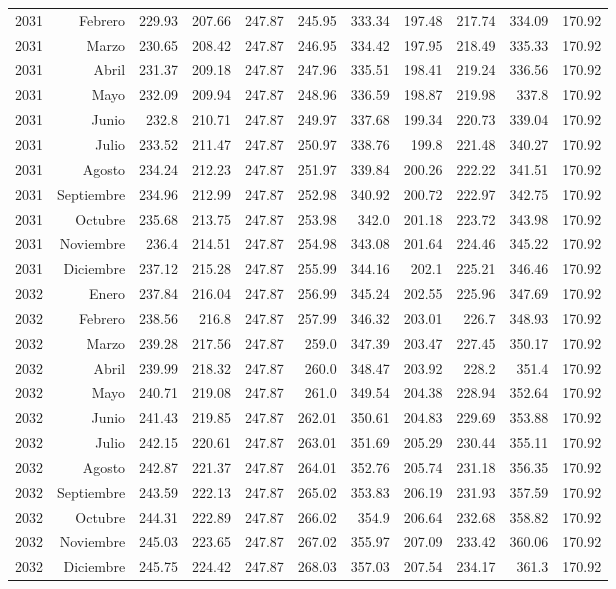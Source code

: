 \documentclass{article}%
\begin{document}
\begin{longtable}{|l r|r|r|r|r|r|r|r|r|r|}
2031&Febrero&229.93&207.66&247.87&245.95&333.34&197.48&217.74&334.09&170.92\\%
2031&Marzo&230.65&208.42&247.87&246.95&334.42&197.95&218.49&335.33&170.92\\%
2031&Abril&231.37&209.18&247.87&247.96&335.51&198.41&219.24&336.56&170.92\\%
2031&Mayo&232.09&209.94&247.87&248.96&336.59&198.87&219.98&337.8&170.92\\%
2031&Junio&232.8&210.71&247.87&249.97&337.68&199.34&220.73&339.04&170.92\\%
2031&Julio&233.52&211.47&247.87&250.97&338.76&199.8&221.48&340.27&170.92\\%
2031&Agosto&234.24&212.23&247.87&251.97&339.84&200.26&222.22&341.51&170.92\\%
2031&Septiembre&234.96&212.99&247.87&252.98&340.92&200.72&222.97&342.75&170.92\\%
2031&Octubre&235.68&213.75&247.87&253.98&342.0&201.18&223.72&343.98&170.92\\%
2031&Noviembre&236.4&214.51&247.87&254.98&343.08&201.64&224.46&345.22&170.92\\%
2031&Diciembre&237.12&215.28&247.87&255.99&344.16&202.1&225.21&346.46&170.92\\%
2032&Enero&237.84&216.04&247.87&256.99&345.24&202.55&225.96&347.69&170.92\\%
2032&Febrero&238.56&216.8&247.87&257.99&346.32&203.01&226.7&348.93&170.92\\%
2032&Marzo&239.28&217.56&247.87&259.0&347.39&203.47&227.45&350.17&170.92\\%
2032&Abril&239.99&218.32&247.87&260.0&348.47&203.92&228.2&351.4&170.92\\%
2032&Mayo&240.71&219.08&247.87&261.0&349.54&204.38&228.94&352.64&170.92\\%
2032&Junio&241.43&219.85&247.87&262.01&350.61&204.83&229.69&353.88&170.92\\%
2032&Julio&242.15&220.61&247.87&263.01&351.69&205.29&230.44&355.11&170.92\\%
2032&Agosto&242.87&221.37&247.87&264.01&352.76&205.74&231.18&356.35&170.92\\%
2032&Septiembre&243.59&222.13&247.87&265.02&353.83&206.19&231.93&357.59&170.92\\%
2032&Octubre&244.31&222.89&247.87&266.02&354.9&206.64&232.68&358.82&170.92\\%
2032&Noviembre&245.03&223.65&247.87&267.02&355.97&207.09&233.42&360.06&170.92\\%
2032&Diciembre&245.75&224.42&247.87&268.03&357.03&207.54&234.17&361.3&170.92\\%

\end{longtable}
\end{document}
